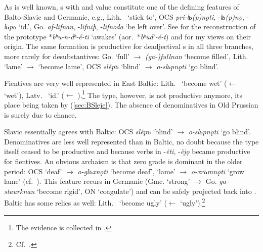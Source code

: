 \documentclass[output=paper,colorlinks,citecolor=brown]{langscibook}
\begin{document}
As is well known, s with  and  value constitute one of the defining features of Balto-Slavic and Germanic, e.g., Lith.\  ‘stick to’, OCS \textit{pri-lь(p)nǫti}, -\textit{lь(p)nǫ}, -\textit{lьpъ} ‘id.’, Go. \textit{af-lifnan}, -\textit{lifniþ}, \nobreakdash-\textit{lifnoda} ‘be left over’. See \citet{Gorbachov2007} for the reconstruction of the  prototype *\textit{bʰu-n-dʰ-é-ti} ‘awakes’ (aor.\ *\textit{bʰudʰ-é-t}) and \citet{VillanuevaSvensson2011} for my views on their origin. The same formation is productive for deadjectival  s in all three branches, more rarely for desubstantives: Go.  ‘full’ $\rightarrow$ \textit{(ga-)fullnan} ‘become filled’, Lith.\  ‘lame’ $\rightarrow$  ‘become lame’, OCS \textit{slěpъ} ‘blind’ $\rightarrow$ \textit{o-slьpnǫti} ‘go blind’.

Fientives are very well represented in East Baltic: Lith.\  ‘become wet’ ($\leftarrow$  ‘wet’), Latv.\  ‘id.’ ($\leftarrow$ ).\footnote{The evidence is collected in \citet{Pakalniskiene2000}.} The type, however, is not productive anymore, its place being taken by  (\ref{sec:BSleje}). The absence of denominatives in Old Prussian is surely due to chance.
 
Slavic essentially agrees with Baltic: OCS \textit{slěpъ} ‘blind’ $\rightarrow$ \textit{o-slьpnǫti} ‘go blind’. Denominatives  are less well represented than in Baltic, no doubt because the  type  itself ceased to be productive and because verbs in \nobreakdash-\textit{ěti}, \nobreakdash-\textit{ějǫ} became productive for fientives. An obvious archaism is that zero grade is dominant in the older period: OCS  ‘deaf’ $\rightarrow$ \textit{o-glъxnǫti} ‘become deaf’,  ‘lame’ $\rightarrow$  \textit{o-xrъmnǫti} ‘grow lame’ (cf.\ \citealt[241--242]{Vaillant1966}). This feature recurs in Germanic (Gmc.  ‘strong’ $\rightarrow$ Go. \textit{ga-staurknan} ‘become rigid’, ON  ‘coagulate’) and can be safely projected back into . Baltic has some relics as well: Lith.\  ‘become ugly’ ($\leftarrow$  ‘ugly’).\footnote{Cf.\ \citet{VillanuevaSvensson2016}.}
\end{document}
